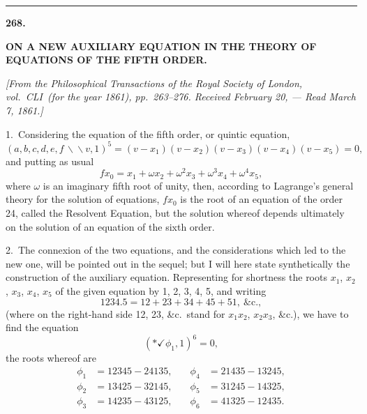\documentclass[11pt,a4paper]{book}
\begin{document}
\newpage
\begin{center}
\rule{0.5\textwidth}{0.4pt}
\end{center}


\newpage
\setcounter{page}{321}
\begin{center}
\textbf{268.}\par
\smallskip
\textbf{ON A NEW AUXILIARY EQUATION IN THE THEORY OF EQUATIONS OF THE FIFTH ORDER.}\par
\smallskip
\textit{[From the \textit{Philosophical Transactions} of the Royal Society of London, vol.~CLI\ (for the year 1861), pp.~263--276. Received February 20, --- Read March 7, 1861.]}
\end{center}

\smallskip

1.\ Considering the equation of the fifth order, or quintic equation,
\[
(a,b,c,d,e,f\,\backslash\!\!\backslash v,1)^5 = (v-x_1)(v-x_2)(v-x_3)(v-x_4)(v-x_5) = 0,
\]
and putting as usual
\[
fx_0 = x_1 + \omega x_2 + \omega^2 x_3 + \omega^3 x_4 + \omega^4 x_5,
\]
where $\omega$ is an imaginary fifth root of unity, then, according to Lagrange's general theory for the solution of equations, $fx_0$ is the root of an equation of the order 24, called the Resolvent Equation, but the solution whereof depends ultimately on the solution of an equation of the sixth order.

2.\ The connexion of the two equations, and the considerations which led to the new one, will be pointed out in the sequel; but I will here state synthetically the construction of the auxiliary equation. Representing for shortness the roots $x_1$, $x_2$, $x_3$, $x_4$, $x_5$ of the given equation by 1, 2, 3, 4, 5, and writing
\[
1234.5 = 12+23+34+45+51,\ \text{\&c.},
\]
(where on the right-hand side 12, 23, \&c.\ stand for $x_1x_2$, $x_2x_3$, \&c.), we have to find the equation
\[
(*\checkmark\phi_1, 1)^6 = 0,
\]
the roots whereof are
\begin{align*}
\phi_1 &= 12345-24135,\quad &\phi_4 &= 21435-13245,\\
\phi_2 &= 13425-32145,\quad &\phi_5 &= 31245-14325,\\
\phi_3 &= 14235-43125,\quad &\phi_6 &= 41325-12435.
\end{align*}
\end{document}
